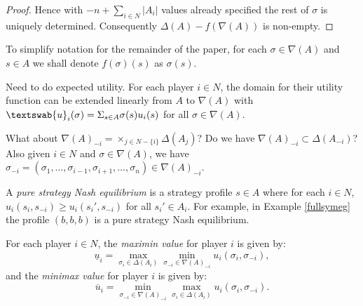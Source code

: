 \begin{proposition}
\begin{proof}
			Hence with $-n + \sum_{i \in N}|A_i|$ values already specified the rest of $\sigma$ is uniquely determined. Consequently $\Delta(A) - f(\nabla(A))$ is non-empty. %
		\end{proof}
	\end{proposition}
	
	To simplify notation for the remainder of the paper, for each $\sigma \in \nabla(A)$ and $s \in A$ we shall denote $f(\sigma)(s)$ as $\sigma(s)$. 
	
	
	
	Need to do expected utility. For each player $i \in N$, the domain for their utility function can be extended linearly from $A$ to $\nabla(A)$ with $\textswab{u}_i(\sigma) = \Sigma_{s \in A}\sigma(s)u_i(s)$ for all $\sigma \in \nabla(A)$.
	
	What about ${\nabla(A)}_{-i} = \times_{j \in N-\{i\}}\Delta(A_j)$? Do we have ${\nabla(A)}_{-i} \subset \Delta(A_{-i})$? Also given $i \in N$ and $\sigma \in \nabla(A)$, we have $\sigma_{-i} = (\sigma_1, \ldots, \sigma_{i-1}, \sigma_{i+1}, \ldots, \sigma_n) \in {\nabla(A)}_{-i}$.
	
	A \textit{pure strategy Nash equilibrium} is a strategy profile $s \in A$ where for each $i \in N$, $u_i(s_i, s_{-i}) \geq u_i(s_i', s_{-i})$ for all $s_i' \in A_i$. For example, in Example \ref{fullsymeg} the profile $(b,b,b)$ is a pure strategy Nash equilibrium.
	
	For each player $i \in N$, the \textit{maximin value} for player $i$ is given by:
	\[\underline{u}_i = \max_{\sigma_i \in \Delta(A_i)}\min_{\sigma_{-i} \in {\nabla(A)}_{-i}} u_i(\sigma_i, \sigma_{-i}),\]
	and the \textit{minimax value} for player $i$ is given by:
	\[\overline{u}_i = \min_{\sigma_{-i} \in {\nabla(A)}_{-i}}\max_{\sigma_i \in \Delta(A_i)} u_i(\sigma_i, \sigma_{-i}).\]
	
